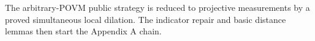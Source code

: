 
The arbitrary-POVM public strategy is reduced to projective measurements by a
proved simultaneous local dilation. The indicator repair and basic distance
lemmas then start the Appendix A chain.


